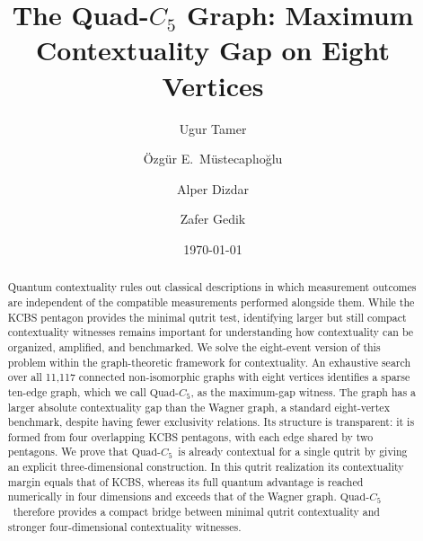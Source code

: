 \documentclass[aps,pra,twocolumn,superscriptaddress,longbibliography,floatfix]{revtex4-2}
\newcommand{\QC}{\ensuremath{\text{Quad-}C_5}}
\begin{document}
\title{The Quad-$C_5$ Graph: Maximum Contextuality Gap on Eight Vertices}

\author{Ugur Tamer}

\author{\"{O}zg\"{u}r E.\ M\"{u}stecapl\i{}o\u{g}lu}

\author{Alper Dizdar}

\author{Zafer Gedik}

\date{\today}

\begin{abstract}
Quantum contextuality rules out classical descriptions in which measurement
outcomes are independent of the compatible measurements performed alongside
them. While the KCBS pentagon provides the minimal qutrit test, identifying
larger but still compact contextuality witnesses remains important for
understanding how contextuality can be organized, amplified, and benchmarked.
We solve the eight-event version of this problem within the graph-theoretic
framework for contextuality. An exhaustive search over all 11{,}117 connected
non-isomorphic graphs with eight vertices identifies a sparse ten-edge graph,
which we call \QC, as the maximum-gap witness. The graph has a larger
absolute contextuality gap than the Wagner graph, a standard eight-vertex
benchmark, despite having fewer exclusivity relations. Its structure is transparent: it is formed from four
overlapping KCBS pentagons, with each edge shared by two pentagons.
We prove that \QC\ is already contextual for a single qutrit by giving
an explicit three-dimensional construction. In this qutrit realization its
contextuality margin equals that of KCBS, whereas its full quantum advantage is
reached numerically in four dimensions and exceeds that of the Wagner graph.
\QC\ therefore provides a compact bridge between minimal qutrit contextuality
and stronger four-dimensional contextuality witnesses.
\end{abstract}
\end{document}
